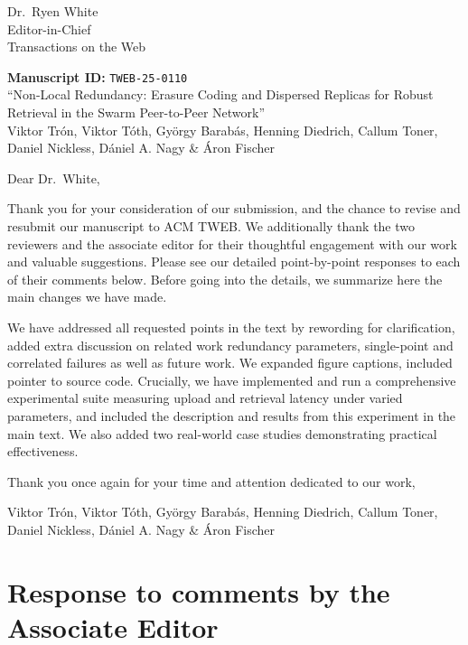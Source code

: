 \documentclass[11pt]{article}
\newcommand{\them}{\it \setlength{\leftskip}{0cm} \setlength{\rightskip}{0cm}}
\begin{document}
\begin{flushright}
  Dr.~Ryen White\\
  Editor-in-Chief\\
  Transactions on the Web
\end{flushright}


\begin{flushleft}
\textbf{Manuscript ID: } \texttt{TWEB-25-0110} \\
``Non-Local Redundancy: Erasure Coding and Dispersed Replicas for Robust Retrieval in the Swarm Peer-to-Peer Network''\\
Viktor Tr\'on, Viktor T\'oth, Gy\"orgy Barab\'as, Henning Diedrich, Callum Toner, Daniel Nickless, D\'{a}niel A. Nagy \& \'{A}ron Fischer
\end{flushleft}


Dear Dr.~White,

Thank you for your consideration of our submission, and the chance to revise and resubmit our manuscript to ACM TWEB. We additionally thank the two reviewers and the associate editor for their thoughtful engagement with our work and valuable suggestions. Please see our detailed point-by-point responses to each of their comments below. Before going into the details, we summarize here the main changes we have made.


We have addressed all requested points in the text by rewording for clarification, added extra discussion on related work redundancy parameters, single-point and correlated failures as well as future work. We expanded figure captions, included pointer to source code. Crucially, we have implemented and run a comprehensive experimental suite measuring upload and retrieval latency under varied parameters, and included the description and results from this experiment in the main text. We also added two real-world case studies demonstrating practical effectiveness.


Thank you once again for your time and attention dedicated to our work,

Viktor Tr\'on, Viktor T\'oth, Gy\"orgy Barab\'as, Henning Diedrich, Callum Toner, Daniel Nickless, D\'{a}niel A. Nagy \& \'{A}ron Fischer



\section*{Response to comments by the Associate Editor}

\them
\end{document}
